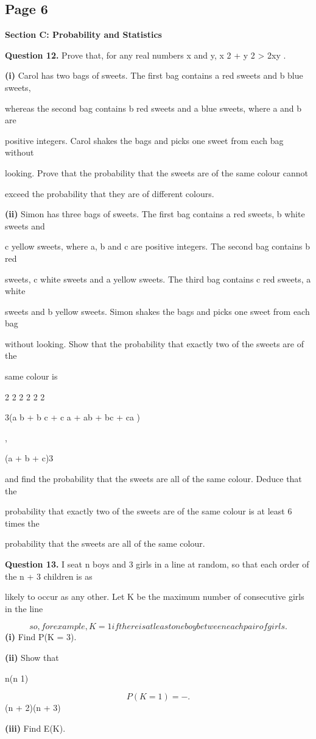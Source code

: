 \documentclass[12pt]{article}
\begin{document}
\subsection*{Page 6}
\begin{flushleft}
\bigskip\textbf{Section C: Probability and Statistics}\par
\bigskip\textbf{Question 12.} Prove that, for any real numbers x and y, x 2 + y 2 > 2xy .\par
\textbf{(i)} Carol has two bags of sweets. The first bag contains a red sweets and b blue sweets,\par
whereas the second bag contains b red sweets and a blue sweets, where a and b are\par
positive integers. Carol shakes the bags and picks one sweet from each bag without\par
looking. Prove that the probability that the sweets are of the same colour cannot\par
exceed the probability that they are of different colours.\par
\textbf{(ii)} Simon has three bags of sweets. The first bag contains a red sweets, b white sweets and\par
c yellow sweets, where a, b and c are positive integers. The second bag contains b red\par
sweets, c white sweets and a yellow sweets. The third bag contains c red sweets, a white\par
sweets and b yellow sweets. Simon shakes the bags and picks one sweet from each bag\par
without looking. Show that the probability that exactly two of the sweets are of the\par
same colour is\par
2 2 2 2 2 2\par
3(a b + b c + c a + ab + bc + ca )\par
,\par
(a + b + c)3\par
and find the probability that the sweets are all of the same colour. Deduce that the\par
probability that exactly two of the sweets are of the same colour is at least 6 times the\par
probability that the sweets are all of the same colour.\par
\bigskip\textbf{Question 13.} I seat n boys and 3 girls in a line at random, so that each order of the n + 3 children is as\par
likely to occur as any other. Let K be the maximum number of consecutive girls in the line\par
\[so, for example, K = 1 if there is at least one boy between each pair of girls.\]
\textbf{(i)} Find P(K = 3).\par
\textbf{(ii)} Show that\par
n(n 1)\par
\[P(K = 1) = - .\]
(n + 2)(n + 3)\par
\textbf{(iii)} Find E(K).\par
\end{flushleft}
\end{document}
